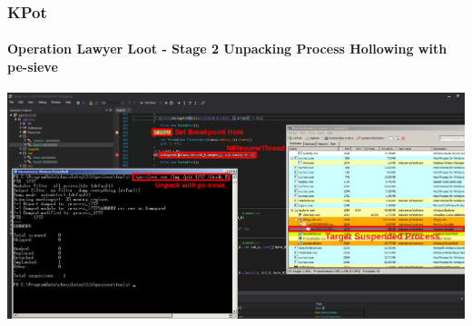 \documentclass[aspectratio=169]{beamer}
\begin{document}
{
\begin{frame}
  \frametitle{KPot}
  \framesubtitle{Operation Lawyer Loot - Stage 2 Unpacking Process Hollowing
    with pe-sieve}
  \begin{center}
    \includegraphics[width=14cm]{kpot-unpacking-11}
  \end{center}
\end{frame}
}
\end{document}

